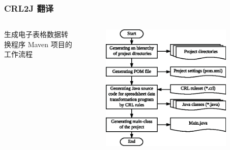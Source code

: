 \documentclass[10pt]{beamer}
\begin{document}
\begin{frame}
\frametitle{CRL2J 翻译}
\begin{columns}[t]
\small 生成电子表格数据转换程序 Maven 项目的工作流程
\begin{figure}
\includegraphics[width=0.95\linewidth]{crl2j_wf_part1}
\end{figure}

\\~\\


\end{columns}
\end{frame}
\end{document}
